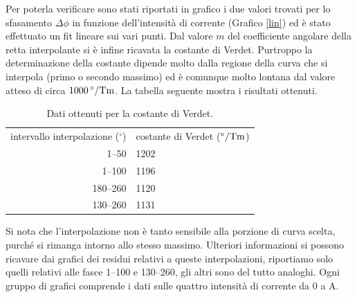 \documentclass[italian,a4paper]{article}
\begin{document}
Per poterla verificare sono stati riportati in grafico i due valori trovati per lo sfasamento $\Delta\phi$ in funzione dell'intensità di corrente (Grafico \ref{lin}) ed è stato effettuato un fit lineare sui vari punti.
Dal valore $m$ del coefficiente angolare della retta interpolante si è
infine ricavata la costante di Verdet.
Purtroppo la determinazione della costante
dipende molto dalla regione della curva che si interpola (primo o secondo
massimo) ed è comunque molto lontana dal valore atteso di circa
$\unit[1000]{^\circ / Tm}$. La tabella seguente mostra i risultati ottenuti.
\begin{table}[h]
    \centering
    \begin{tabular}{rl}
        intervallo interpolazione ($^\circ$) & costante di Verdet
        ($\unit[]{^\circ /Tm}$)\\
        1--50 & 1202\\
        1--100 & 1196\\
        180--260 & 1120\\
        130--260 & 1131\\
    \end{tabular}
    \caption{Dati ottenuti per la costante di Verdet.}
    \label{tab:verdet}
\end{table}
Si nota che l'interpolazione non è tanto sensibile
alla porzione di curva scelta, purch\'e si rimanga intorno allo stesso
massimo.
Ulteriori informazioni si possono ricavare dai grafici dei residui relativi
a queste interpolazioni, riportiamo solo quelli relativi alle fasce 1--100 e
130--260, gli altri sono del tutto analoghi. Ogni gruppo di grafici
comprende i dati sulle quattro intensità di corrente da 0 a
\unit[3]{A}.
\end{document}
